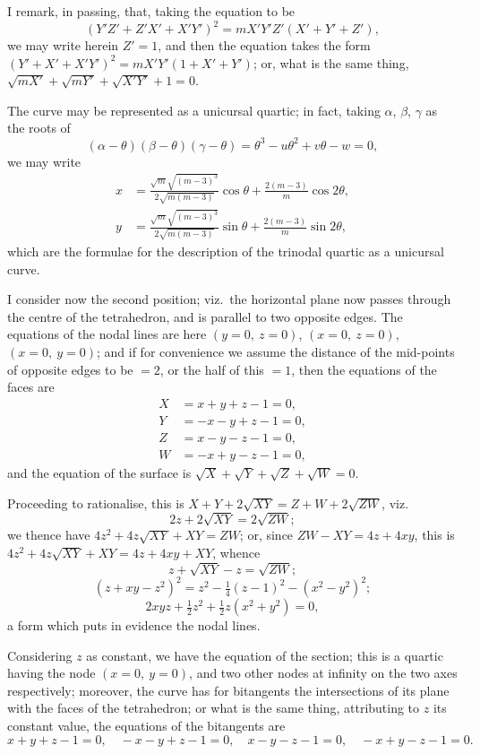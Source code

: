 \documentclass[11pt,a4paper]{book}
\begin{document}
I remark, in passing, that, taking the equation to be
\[
(Y'Z' + Z'X' + X'Y')^2 = mX'Y'Z'(X' + Y' + Z'),
\]
we may write herein $Z' = 1$, and then the equation takes the form $(Y' + X' + X'Y')^2 = mX'Y'(1 + X' + Y')$; or, what is the same thing, $\sqrt{mX'} + \sqrt{mY'} + \sqrt{X'Y'} + 1 = 0$.

\newpage
\setcounter{page}{6}

The curve may be represented as a unicursal quartic; in fact, taking $\alpha$, $\beta$, $\gamma$ as the roots of
\[
(\alpha - \theta)(\beta - \theta)(\gamma - \theta) = \theta^3 - u\theta^2 + v\theta - w = 0,
\]
we may write
\begin{align*}
x &= \frac{\sqrt{m}\sqrt{(m - 3)^3}}{2\sqrt{m(m - 3)}}\cos \theta + \frac{2(m - 3)}{m}\cos 2\theta,\\
y &= \frac{\sqrt{m}\sqrt{(m - 3)^3}}{2\sqrt{m(m - 3)}}\sin \theta + \frac{2(m - 3)}{m}\sin 2\theta,
\end{align*}
which are the formulae for the description of the trinodal quartic as a unicursal curve.

\newpage
\setcounter{page}{7}

I consider now the second position; viz.\ the horizontal plane now passes through the centre of the tetrahedron, and is parallel to two opposite edges. The equations of the nodal lines are here $(y = 0,\ z = 0)$, $(x = 0,\ z = 0)$, $(x = 0,\ y = 0)$; and if for convenience we assume the distance of the mid-points of opposite edges to be $= 2$, or the half of this $= 1$, then the equations of the faces are
\begin{align*}
X &= x + y + z - 1 = 0,\\
Y &= -x - y + z - 1 = 0,\\
Z &= x - y - z - 1 = 0,\\
W &= -x + y - z - 1 = 0,
\end{align*}
and the equation of the surface is $\sqrt{X} + \sqrt{Y} + \sqrt{Z} + \sqrt{W} = 0$.

Proceeding to rationalise, this is $X + Y + 2\sqrt{XY} = Z + W + 2\sqrt{ZW}$, viz.
\[
2z + 2\sqrt{XY} = 2\sqrt{ZW};
\]
we thence have $4z^2 + 4z\sqrt{XY} + XY = ZW$; or, since $ZW - XY = 4z + 4xy$, this is $4z^2 + 4z\sqrt{XY} + XY = 4z + 4xy + XY$, whence
\[
z + \sqrt{XY} - z = \sqrt{ZW};
\]
\[
(z + xy - z^2)^2 = z^2 - \tfrac{1}{4}(z - 1)^2 - (x^2 - y^2)^2;
\]
\[
2xyz + \tfrac{1}{2}z^2 + \tfrac{1}{2}z(x^2 + y^2) = 0,
\]
a form which puts in evidence the nodal lines.

Considering $z$ as constant, we have the equation of the section; this is a quartic having the node $(x = 0,\ y = 0)$, and two other nodes at infinity on the two axes respectively; moreover, the curve has for bitangents the intersections of its plane with the faces of the tetrahedron; or what is the same thing, attributing to $z$ its constant value, the equations of the bitangents are
\[
x + y + z - 1 = 0,\quad -x - y + z - 1 = 0,\quad x - y - z - 1 = 0,\quad -x + y - z - 1 = 0.
\]
\end{document}
